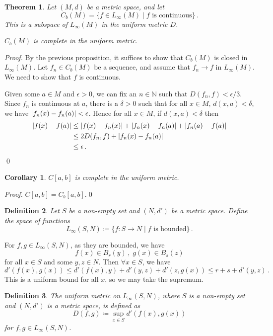 \documentclass{article}
\theoremstyle{plain}\theoremheaderfont{\normalfont\itshape}\theorembodyfont{\rmfamily}\theoremseparator{.}\newtheorem*{rem}{Remark}\newtheorem*{ex}{Example}\newtheorem*{proof}{Proof}\newtheorem*{altp}{Alternative proof}
\theoremstyle{plain}\theoremheaderfont{\normalfont\bfseries}\theorembodyfont{\rmfamily}\theoremseparator{.}\newtheorem{thm}{Theorem}[section]\newtheorem{lem}[thm]{Lemma}\newtheorem{prop}[thm]{Proposition}\newtheorem*{cor}{Corollary}\newtheorem{defn}[thm]{Definition}\newtheorem{clm}[thm]{Claim}\newtheorem{clminproof}{Claim}
\theoremstyle{break}\theoremheaderfont{\normalfont\itshape}\theorembodyfont{\rmfamily}\theoremseparator{.\medskip}\newtheorem*{proofskip}{Proof}\newtheorem*{exs}{Examples}\newtheorem*{rems}{Remarks}
\theoremstyle{break}\theoremheaderfont{\normalfont\bfseries}\theorembodyfont{\rmfamily}\theoremseparator{.\medskip}\newtheorem{lemskip}[thm]{Lemma}\newtheorem{defnskip}[thm]{Definition}\newtheorem{propskip}[thm]{Proposition}\newtheorem{thmskip}[thm]{Theorem}
\newcommand{\qed}{\hfill\ensuremath{\Box}}
\begin{document}
    \begin{thm}
        Let \((M,d)\) be a metric space, and let
        \[C_b(M)=\{f\in L_\infty(M)\mid f \text{ is continuous}\}\,.\]
        This is a subspace of \(L_\infty(M)\) in the uniform metric \(D\).

        \(C_b(M)\) is complete in the uniform metric.
    \end{thm}
    \begin{proof}
        By the previous proposition, it suffices to show that \(C_b(M)\) is closed in \(L_\infty(M)\). Let \(f_n\in C_b(M)\) be a sequence, and assume that \(f_n\to f\) in \(L_\infty(M)\). We need to show that \(f\) is continuous.

        Given some \(a\in M\) and \(\epsilon>0\), we can fix an \(n\in\mathbb{N}\) such that \(D(f_n,f)<\epsilon/3\). Since \(f_n\) is continuous at \(a\), there is a \(\delta>0\) such that for all \(x\in M\), \(d(x,a)<\delta\), we have \(\abs{f_n(x)-f_n(a)}<\epsilon\). Hence for all \(x\in M\), if \(d(x,a)<\delta\) then
        \begin{align*}
            \abs{f(x)-f(a)}&\le\abs{f(x)-f_n(x)}+\abs{f_n(x)-f_n(a)}+\abs{f_n(a)-f(a)}\\
            &\le 2D(f_n,f)+\abs{f_n(x)-f_n(a)}\\
            &\le \epsilon\,.
        \end{align*}\qed
    \end{proof}
    \begin{cor}
        \(C[a,b]\) is complete in the uniform metric.
    \end{cor}
    \begin{proof}
        \(C[a,b]=C_b[a,b]\).\qed
    \end{proof}

    \begin{defn}
        Let \(S\) be a non-empty set and \((N,d')\) be a metric space. Define the space of functions
        \[L_\infty(S,N)\coloneqq\{f:S\to N\mid f\text{ is bounded}\}\,.\]
    \end{defn}

    For \(f,g\in L_\infty(S,N)\), as they are bounded, we have
    \[f(x)\in B_r(y)\,,\; g(x)\in B_s(z)\]
    for all \(x\in S\) and some \(y,z\in N\). Then \(\forall x\in S\), we have
    \[d'(f(x),g(x))\le d'(f(x),y)+d'(y,z)+d'(z,g(x))\le r+s+d'(y,z)\,.\]
    This is a uniform bound for all \(x\), so we may take the supremum.

    \begin{defn}
        The \textit{uniform metric} on \(L_\infty(S,N)\), where \(S\) is a non-empty set and \((N,d')\) is a metric space, is defined as
        \[D(f,g)\coloneqq \sup_{x\in S}d'(f(x),g(x))\]
        for \(f,g\in L_\infty(S,N)\).
    \end{defn}
\end{document}

